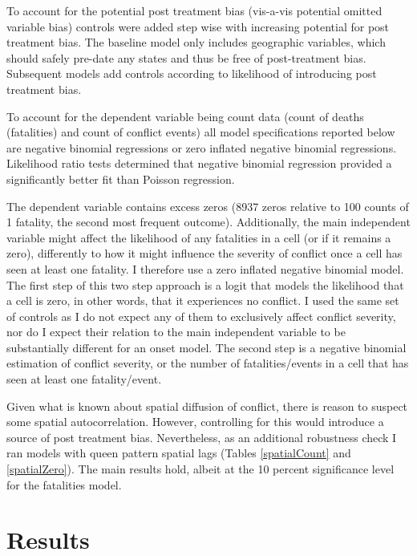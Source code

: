 \documentclass[12pt]{article}
\begin{document}
To account for the potential post treatment bias (vis-a-vis potential omitted
variable bias) controls were added step wise with increasing potential for post
treatment bias. The baseline model only includes geographic variables, which
should safely pre-date any states and thus be free of post-treatment bias.
Subsequent models add controls according to likelihood of introducing post
treatment bias.

To account for the dependent variable being count data (count of deaths
(fatalities) and count of conflict events) all model
specifications reported below are negative binomial regressions or zero inflated
negative binomial regressions. Likelihood ratio tests determined that negative
binomial regression provided a significantly better fit than Poisson regression.

The dependent variable contains excess zeros (8937 zeros relative to 100 counts
of 1 fatality, the second most frequent outcome). Additionally, the main
independent variable might affect the likelihood of any fatalities in a cell (or
if it remains a zero), differently to how it might influence the severity of
conflict once a cell has seen at least one fatality. I therefore use a zero
inflated negative binomial model. The first step of this two step approach is a
logit that models the likelihood that a cell is zero, in other words, that it
experiences no conflict. I used the same set of controls as I do not expect any
of them to exclusively affect conflict severity, nor do I expect their relation
to the main independent variable to be substantially different for an onset
model. The second step is a negative binomial estimation of conflict severity,
or the number of fatalities/events in a cell that has seen at least one
fatality/event.

Given what is known about spatial diffusion of conflict, there is reason to
suspect some spatial autocorrelation. However, controlling for this would
introduce a source of post treatment bias. Nevertheless, as an additional
robustness check I ran models with queen pattern spatial lags (Tables
\ref{spatialCount} and \ref{spatialZero}). The main results hold, albeit at the
10 percent significance level for the fatalities model.

\section{Results} \label{Results}
\end{document}
